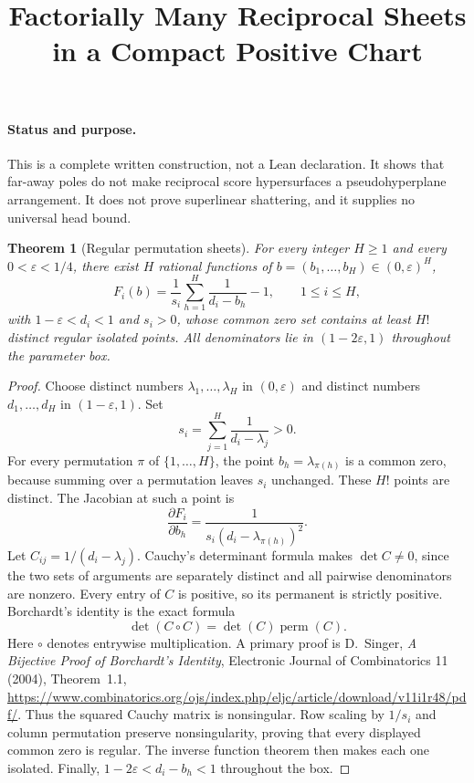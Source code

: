 \documentclass[11pt]{article}
\title{Factorially Many Reciprocal Sheets in a Compact Positive Chart}
\author{}
\date{}
\newtheorem{theorem}{Theorem}
\begin{document}
\maketitle

\paragraph{Status and purpose.}
This is a complete written construction, not a Lean declaration.
It shows that far-away poles do not make reciprocal score hypersurfaces
a pseudohyperplane arrangement. It does not prove superlinear
shattering, and it supplies no universal head bound.

\begin{theorem}[Regular permutation sheets]
For every integer $H\ge1$ and every $0<\varepsilon<1/4$, there exist
$H$ rational functions of $b=(b_1,\ldots,b_H)\in(0,\varepsilon)^H$,
\[
 F_i(b)=\frac1{s_i}\sum_{h=1}^H\frac1{d_i-b_h}-1,
 \qquad 1\le i\le H,
\]
with $1-\varepsilon<d_i<1$ and $s_i>0$, whose common zero set
contains at least $H!$ distinct regular isolated points. All denominators
lie in $(1-2\varepsilon,1)$ throughout the parameter box.
\end{theorem}

\begin{proof}
Choose distinct numbers $\lambda_1,\ldots,\lambda_H$ in
$(0,\varepsilon)$ and distinct numbers $d_1,\ldots,d_H$ in
$(1-\varepsilon,1)$. Set
\[
 s_i=\sum_{j=1}^H\frac1{d_i-\lambda_j}>0.
\]
For every permutation $\pi$ of $\{1,\ldots,H\}$, the point
$b_h=\lambda_{\pi(h)}$ is a common zero, because summing over a
permutation leaves $s_i$ unchanged. These $H!$ points are distinct.
The Jacobian at such a point is
\[
 \frac{\partial F_i}{\partial b_h}
 =\frac1{s_i(d_i-\lambda_{\pi(h)})^2}.
\]
Let $C_{ij}=1/(d_i-\lambda_j)$. Cauchy's determinant formula makes
$\det C\ne0$, since the two sets of arguments are separately distinct
and all pairwise denominators are nonzero. Every entry of $C$ is
positive, so its permanent is strictly positive. Borchardt's identity
is the exact formula
\[
 \det(C\mathbin{\circ}C)=\det(C)\operatorname{perm}(C).
\]
Here $\circ$ denotes entrywise multiplication. A primary proof is
D.~Singer, \emph{A Bijective Proof of Borchardt's Identity},
Electronic Journal of Combinatorics 11 (2004), Theorem~1.1,
\url{https://www.combinatorics.org/ojs/index.php/eljc/article/download/v11i1r48/pdf/}.
Thus the squared Cauchy matrix is nonsingular. Row scaling by
$1/s_i$ and column permutation preserve nonsingularity, proving that
every displayed common zero is regular. The inverse function theorem
then makes each one isolated. Finally,
$1-2\varepsilon<d_i-b_h<1$ throughout the box.
\end{proof}
\end{document}

